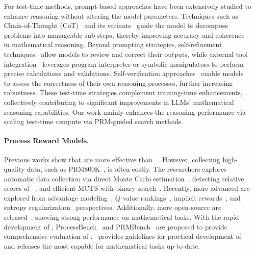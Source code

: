 For test-time methods, prompt-based approaches have been extensively studied to enhance reasoning without altering the model parameters. Techniques such as Chain-of-Thought (CoT)~\citep{CoT} and its variants~\citep{ToT, CoMAT} guide the model to decompose problems into manageable sub-steps, thereby improving accuracy and coherence in mathematical reasoning. Beyond prompting strategies, self-refinement techniques~\citep{Self-Refine} allow models to review and correct their outputs, while external tool integration~\citep{PAL, PoT} leverages program interpreter or symbolic manipulators to perform precise calculations and validations.
Self-verification approaches~\citep{Self-Verification} enable models to assess the correctness of their own reasoning processes, further increasing robustness.
These test-time strategies complement training-time enhancements, collectively contributing to significant improvements in LLMs' mathematical reasoning capabilities. Our work mainly enhances the reasoning performance via scaling test-time compute via PRM-guided search methods.

\paragraph{Process Reward Models.}

Previous works show that \PRMs are more effective than \ORMs~\citep{uesato2022solving, PRM800K}. However, collecting high-quality \PRMs data, such as PRM800K~\citep{PRM800K}, is often costly. 
The researchers explores automatic \PRM data collection via direct Monte Carlo estimation~\citep{Math-Shepherd}, detecting relative scores of \ORMs~\citep{AutoPSV}, and efficient MCTS with binary search~\citep{OmegaPRM}.
Recently, more advanced \PRMs are explored from advantage modeling~\citep{PAV}, $Q$-value rankings~\citep{PQM}, implicit rewards~\citep{Implicit-PRM}, and entropy regularization~\citep{ER-PRM} perspectives. Additionally, more open-source \PRMs are released~\citep{RLHFlow, Skywork-o1, ER-PRM, PQM, Implicit-PRM, PRMLessons}, showing strong performance on mathematical tasks. With the rapid development of \PRMs, ProcessBench~\citep{ProcessBench} and PRMBench~\citep{PRMBench} are proposed to provide comprehensive evaluation of \PRMs.~\citet{PRMLessons} provides guidelines for practical development of \PRMs and releases the most capable \PRMs for mathematical tasks up-to-date.

